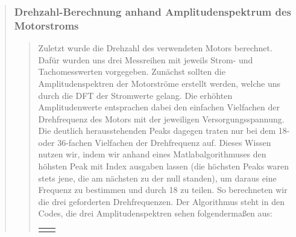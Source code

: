 \begin{quote}
\begin{quote}
	    \end{quote}%
         
	    \subsubsection{Drehzahl-Berechnung anhand Amplitudenspektrum des
	    Motorstroms}
	    \begin{quote}
	    
	    Zuletzt wurde die Drehzahl des verwendeten Motors berechnet. Dafür wurden
	    uns drei Messreihen mit jeweils Strom- und Tachomesswerten vorgegeben.
	    Zunächst sollten die Amplitudenspektren der Motorströme erstellt werden,
	    welche uns durch die DFT der Stromwerte gelang. Die erhöhten Amplitudenwerte entsprachen
	    dabei den einfachen Vielfachen der Drehfrequenz des Motors mit der
	    jeweiligen Versorgungsspannung. Die deutlich herausstehenden Peaks dagegen
	    traten nur bei dem 18- oder 36-fachen Vielfachen der Drehfrequenz auf.
	    Dieses Wissen nutzen wir, indem wir anhand eines Matlabalgorithmuses den
	    höhsten Peak mit Index ausgaben lassen (die höchsten Peaks waren stets
	    jene, die am nächsten zu der null standen), um daraus eine Frequenz zu
	    bestimmen und durch 18 zu teilen. So berechneten wir die drei geforderten
	    Drehfrequenzen. Der Algorithmus steht in den Codes, die drei
	    Amplitudenspektren sehen folgendermaßen aus:
	    
	     \begin{center}
                \begin{tabular}{ll}
    
                \hspace{-12em}
                    \begin{minipage}{0.6\textwidth}
    

\end{minipage}
\end{tabular}
\end{center}
\end{quote}
\end{quote}
